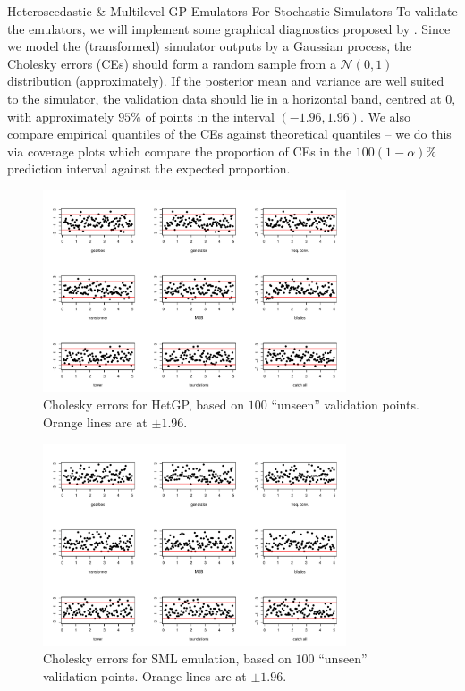 \begin{chapter}{Heteroscedastic \& Multilevel GP Emulators For Stochastic Simulators\label{Ch:Hetsml}}
To validate the emulators, we will implement some graphical diagnostics proposed by \citet{Bastos09}. Since we model the (transformed) simulator outputs by a Gaussian process, the Cholesky errors (CEs) should form a random sample from a $\mathcal{N}(0, 1)$ distribution (approximately). If the posterior mean and variance are well suited to the simulator, the validation data should lie in a horizontal band, centred at $0$, with approximately $95\%$ of points in the interval $(-1.96, 1.96)$. We also compare empirical quantiles of the CEs against theoretical quantiles -- we do this via coverage plots which compare the proportion of CEs in the $100(1-\alpha)\%$ prediction interval against the expected proportion.
\begin{figure}[!ht]
    \centering
       \includegraphics[width = 0.8\textwidth]{sml-het-fig2/het-resids-new3.pdf}
       \caption{Cholesky errors for HetGP, based on $100$ ``unseen'' validation points. Orange lines are at $\pm 1.96$.\label{Fig:het-resids}}
\end{figure}
\begin{figure}[!ht]
    \centering
\includegraphics[width = 0.8\textwidth]{sml-het-fig2/sml-resids-new3.pdf}
\caption{Cholesky errors for SML emulation, based on $100$ ``unseen'' validation points. Orange lines are at $\pm 1.96$.\label{Fig:sml-resids}}

\end{figure}
\end{chapter}
